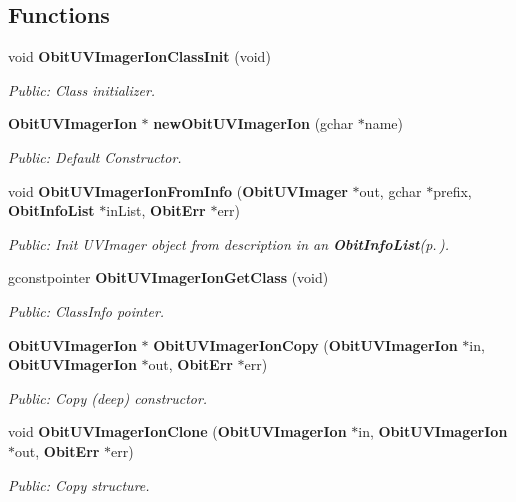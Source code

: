 \subsection*{Functions}
\begin{CompactItemize}
\item 
void {\bf Obit\-UVImager\-Ion\-Class\-Init} (void)
\begin{CompactList}\small\item\em Public: Class initializer. \item\end{CompactList}\item 
{\bf Obit\-UVImager\-Ion} $\ast$ {\bf new\-Obit\-UVImager\-Ion} (gchar $\ast$name)
\begin{CompactList}\small\item\em Public: Default Constructor. \item\end{CompactList}\item 
void {\bf Obit\-UVImager\-Ion\-From\-Info} ({\bf Obit\-UVImager} $\ast$out, gchar $\ast$prefix, {\bf Obit\-Info\-List} $\ast$in\-List, {\bf Obit\-Err} $\ast$err)
\begin{CompactList}\small\item\em Public: Init UVImager object from description in an {\bf Obit\-Info\-List}{\rm (p.\,\pageref{structObitInfoList})}. \item\end{CompactList}\item 
gconstpointer {\bf Obit\-UVImager\-Ion\-Get\-Class} (void)
\begin{CompactList}\small\item\em Public: Class\-Info pointer. \item\end{CompactList}\item 
{\bf Obit\-UVImager\-Ion} $\ast$ {\bf Obit\-UVImager\-Ion\-Copy} ({\bf Obit\-UVImager\-Ion} $\ast$in, {\bf Obit\-UVImager\-Ion} $\ast$out, {\bf Obit\-Err} $\ast$err)
\begin{CompactList}\small\item\em Public: Copy (deep) constructor. \item\end{CompactList}\item 
void {\bf Obit\-UVImager\-Ion\-Clone} ({\bf Obit\-UVImager\-Ion} $\ast$in, {\bf Obit\-UVImager\-Ion} $\ast$out, {\bf Obit\-Err} $\ast$err)
\begin{CompactList}\small\item\em Public: Copy structure. \item\end{CompactList}\item 

\end{CompactItemize}

